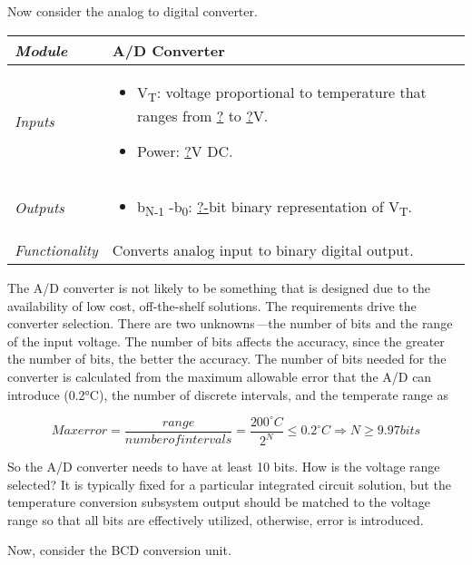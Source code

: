 Now consider the analog to digital converter.



\begin{table}
\begin{tabular}{|l|m{10cm}|}
\hline
\emph{Module} & A/D Converter\\ \hline
\emph{Inputs} & 
\begin{itemize}
\item
  V\textsubscript{T}: voltage proportional to temperature that ranges
  from \ul{?} to \ul{?}V.
\item  Power: \ul{?}V DC.
\end{itemize}  \\ \hline
\emph{Outputs} & 
\begin{itemize}
\item  b\textsubscript{N-1} -b\textsubscript{0}: \ul{?-}bit binary
  representation of V\textsubscript{T}.
\end{itemize}\\ \hline
\emph{Functionality} & Converts analog input to binary digital
output. \\ \hline
\end{tabular}
\end{table}



The A/D converter is not likely to be something that is designed due to
the availability of low cost, off-the-shelf solutions. The requirements
drive the converter selection. There are two unknowns\emph{---}the
number of bits and the range of the input voltage. The number of bits
affects the accuracy, since the greater the number of bits, the better
the accuracy. The number of bits needed for the converter is calculated
from the maximum allowable error that the A/D can introduce (0.2°C), the
number of discrete intervals, and the temperate range as

$$Max error = \frac{range}{number of intervals} = \frac{200^{\circ}  C}{2^N} \leq 0.2^{\circ}  C \Rightarrow N \geq 9.97 bits$$

So the A/D converter needs to have at least 10 bits. How is the voltage
range selected? It is typically fixed for a particular integrated
circuit solution, but the temperature conversion subsystem output should
be matched to the voltage range so that all bits are effectively
utilized, otherwise, error is introduced.

Now, consider the BCD conversion unit.

